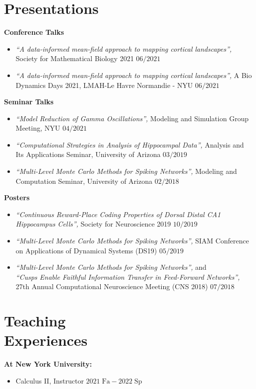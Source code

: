 \documentclass[margin, 11pt]{res} %
\begin{document}
\begin{resume}
\section{Presentations}
\label{Presentations}
{\bf Conference Talks}
\begin{itemize}
\item \textit{“A data-informed mean-field approach to mapping cortical landscapes”,} 
Society for Mathematical Biology 2021 \hfill $06/2021$
\item \textit{“A data-informed mean-field approach to mapping cortical landscapes”,} 
A Bio Dynamics Days 2021, LMAH-Le Havre Normandie - NYU \hfill $06/2021$
\end{itemize}

{\bf Seminar Talks}
\begin{itemize}
\item \textit{“Model Reduction of Gamma Oscillations”,} 
Modeling and Simulation Group Meeting, NYU \hfill $04/2021$
\item \textit{“Computational Strategies in Analysis of Hippocampal Data”,} 
Analysis and Its Applications Seminar, University of Arizona \hfill $03/2019$
\item \textit{“Multi-Level Monte Carlo Methods for Spiking Networks”,} 
Modeling and Computation Seminar, University of Arizona \hfill $02/2018$
\end{itemize}

{\bf Posters}
\begin{itemize}
\item \textit{“Continuous Reward-Place Coding Properties of Dorsal Distal CA1 Hippocampus Cells”,}
Society for Neuroscience 2019  \hfill $10/2019$
\item \textit{“Multi-Level Monte Carlo Methods for Spiking Networks”,} 
SIAM Conference on Applications of Dynamical Systems (DS19) \hfill $05/2019$
\item \textit{“Multi-Level Monte Carlo Methods for Spiking Networks”,} and \\
\textit{ “Cusps Enable Faithful Information Transfer in Feed-Forward Networks”,}
27th Annual Computational Neuroscience Meeting (CNS 2018) \hfill $07/2018$
\end{itemize}


\section{Teaching \\ Experiences}
{\bf At New York University:}
\begin{itemize}
\item Calculus II, Instructor \hfill $2021\;\mathrm{Fa}-2022\;\mathrm{Sp}$ 
\end{itemize}


\end{resume}
\end{document}
